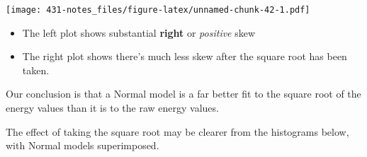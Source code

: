 \documentclass[
]{book}
\newenvironment{Shaded}{\begin{snugshade}}{\end{snugshade}}
\newcommand{\CommentTok}[1]{\textcolor[rgb]{0.56,0.35,0.01}{\textit{#1}}}
\newcommand{\ControlFlowTok}[1]{\textcolor[rgb]{0.13,0.29,0.53}{\textbf{#1}}}
\newcommand{\DataTypeTok}[1]{\textcolor[rgb]{0.13,0.29,0.53}{#1}}
\newcommand{\DecValTok}[1]{\textcolor[rgb]{0.00,0.00,0.81}{#1}}
\newcommand{\FloatTok}[1]{\textcolor[rgb]{0.00,0.00,0.81}{#1}}
\newcommand{\KeywordTok}[1]{\textcolor[rgb]{0.13,0.29,0.53}{\textbf{#1}}}
\newcommand{\NormalTok}[1]{#1}
\newcommand{\OperatorTok}[1]{\textcolor[rgb]{0.81,0.36,0.00}{\textbf{#1}}}
\newcommand{\StringTok}[1]{\textcolor[rgb]{0.31,0.60,0.02}{#1}}
\providecommand{\tightlist}{%
  \setlength{\itemsep}{0pt}\setlength{\parskip}{0pt}}
\begin{document}
\texttt{[image: 431-notes\_files/figure-latex/unnamed-chunk-42-1.pdf]}

\begin{itemize}
\tightlist
\item
  The left plot shows substantial \textbf{right} or \emph{positive} skew
\item
  The right plot shows there's much less skew after the square root has been taken.
\end{itemize}

Our conclusion is that a Normal model is a far better fit to the square root of the energy values than it is to the raw energy values.

The effect of taking the square root may be clearer from the histograms below, with Normal models superimposed.

\begin{Shaded}
\end{Shaded}
\end{document}
